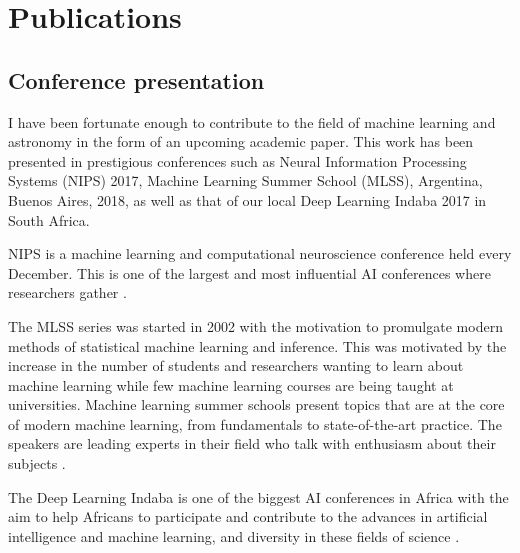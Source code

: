 \chapter*{Publications}

\section*{Conference presentation}

I have been fortunate enough to contribute to the field of machine learning and astronomy in the form of an
upcoming academic paper. This work has been presented in prestigious conferences such as Neural Information Processing Systems (NIPS) 2017, Machine Learning Summer School (MLSS), Argentina, Buenos Aires, 2018, as well as that of our local Deep Learning Indaba 2017 in South Africa.

NIPS is a machine learning and computational neuroscience conference held  every December. This is one of the largest and most influential AI conferences where researchers gather \citep{NIPS}. 

The MLSS series was started in 2002 with the motivation to
promulgate modern methods of statistical machine learning and inference. This was motivated by the increase in the number of students and researchers wanting to learn about machine learning while few machine learning courses are being taught at universities.
Machine learning summer schools present topics that are at the core of modern machine learning, from fundamentals to state-of-the-art practice. The speakers are leading experts in their field who talk with enthusiasm about their subjects \citep{MLSS}.

The Deep Learning Indaba is one of the biggest AI conferences in Africa with the aim to help Africans to participate and contribute to the advances in artificial intelligence and machine learning, and diversity in these fields of science \citep{DLI}. 
 